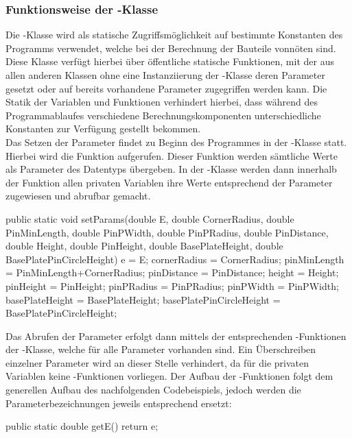 \subsubsection{Funktionsweise der -Klasse}
Die -Klasse wird als statische Zugriffsmöglichkeit auf bestimmte Konstanten des Programms verwendet, welche bei der Berechnung der Bauteile vonnöten sind.
Diese Klasse verfügt hierbei über öffentliche statische Funktionen, mit der aus allen anderen Klassen ohne eine Instanziierung der -Klasse deren Parameter gesetzt oder auf bereits vorhandene Parameter zugegriffen werden kann.
Die Statik der Variablen und Funktionen verhindert hierbei, dass während des Programmablaufes verschiedene  Berechnungskomponenten unterschiedliche Konstanten zur Verfügung gestellt bekommen. \\
Das Setzen der Parameter findet zu Beginn des Programmes in der -Klasse statt.
Hierbei wird die Funktion  aufgerufen.
Dieser Funktion werden sämtliche Werte als Parameter des Datentyps  übergeben.
In der -Klasse werden dann innerhalb der Funktion allen privaten Variablen ihre Werte entsprechend der Parameter zugewiesen und abrufbar gemacht.
\begin{code} 
	public static void setParams(double E, double CornerRadius, double PinMinLength, double PinPWidth, double PinPRadius, double PinDistance, double Height, double PinHeight, double BasePlateHeight, double BasePlatePinCircleHeight){
		e = E;
		cornerRadius = CornerRadius;
		pinMinLength = PinMinLength+CornerRadius;
		pinDistance = PinDistance;
		height = Height;
		pinHeight = PinHeight;
		pinPRadius = PinPRadius;
		pinPWidth = PinPWidth;
		basePlateHeight = BasePlateHeight;
		basePlatePinCircleHeight = BasePlatePinCircleHeight;
	}
\end{code}
Das Abrufen der Parameter erfolgt dann mittels der entsprechenden -Funktionen der -Klasse, welche für alle Parameter vorhanden sind.
Ein Überschreiben einzelner Parameter wird an dieser Stelle verhindert, da für die privaten Variablen keine -Funktionen vorliegen.
Der Aufbau der -Funktionen folgt dem generellen Aufbau des nachfolgenden Codebeispiels, jedoch werden die Parameterbezeichnungen jeweils entsprechend ersetzt:
\begin{code} 
public static double getE() {
	return e;
}
\end{code}
